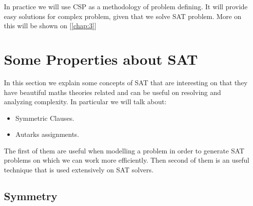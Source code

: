 In practice we will use CSP as a methodology of problem defining. It will provide easy solutions for complex problem, given that we solve SAT problem. More on this will be shown on [\ref{chap:3}]

\section{Some Properties about SAT}
In this section we explain some concepts of SAT that are interesting on that they have beautiful maths theories related and can be useful on resolving and analyzing complexity. In particular we will talk about:
\begin{itemize}
\item Symmetric Clauses. 
\item Autarks assignments.
\end{itemize}

The first of them are useful when modelling a problem in order to generate SAT problems on which we can work more efficiently. Then second of them is an useful technique that is used extensively on SAT solvers.
\subsection{Symmetry}

